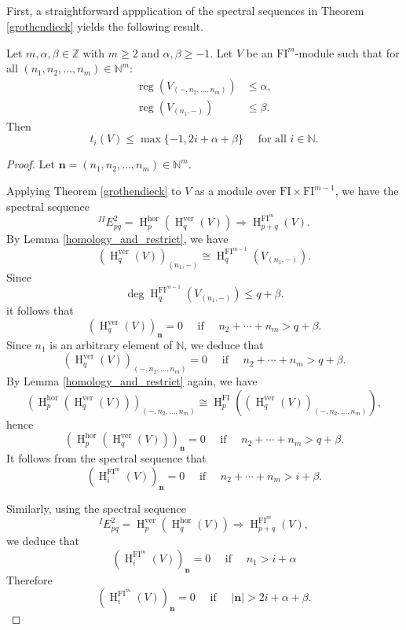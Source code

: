 \documentclass{amsart}
\numberwithin{equation}{section}
\DeclareMathOperator{\reg}{reg}
\DeclareMathOperator{\HH}{H}
\newcommand{\N}{{\mathbb{N}}}
\newcommand{\hor}{{\mathrm{hor}}}
\newcommand{\ver}{{\mathrm{ver}}}
\newcommand{\FI}{{\mathrm{FI}}}
\begin{document}
\subsection{}

First, a straightforward appplication of the spectral sequences in Theorem \ref{grothendieck} yields the following result.

\begin{proposition} \label{prop:1}
   Let $m, \alpha, \beta\in \mathbb{Z}$ with $m\geqslant 2$ and $\alpha, \beta\geqslant -1$. Let $V$ be an $\FI^m$-module such that for all $(n_1, n_2, \ldots, n_m)\in \N^m$:
   \begin{align*}
      \reg\left(V_{(-, n_2, \ldots, n_m)}\right) &\leqslant \alpha,\\
      \reg\left(V_{(n_1, -)}\right) &\leqslant \beta.
   \end{align*} 
   Then 
   \[ t_i(V) \leqslant \max\{-1, 2i + \alpha + \beta\} \quad \mbox{ for all }i\in \N. \]
\end{proposition}

\begin{proof}
   Let $\mathbf{n}=(n_1, n_2, \ldots, n_m) \in \N^m$. 
   
   Applying Theorem \ref{grothendieck} to $V$ as a module over $\FI\times \FI^{m-1}$, we have the spectral sequence
   \[  ^{II}\!E^2_{pq} = \HH^\hor_p (\HH^\ver_q (V)) \Rightarrow \HH^{\FI^m}_{p+q}(V).  \]
   By Lemma \ref{homology_and_restrict}, we have   
   \begin{equation*} 
      (\HH_q^\ver(V))_{(n_1,-)} \cong \HH_q^{\FI^{m-1}}( V_{(n_1,-)} ).  
   \end{equation*} 
   Since 
   \[ \deg \HH_q^{\FI^{m-1}}( V_{(n_1,-)} ) \leqslant q + \beta. \]
   it follows that   
   \[ (\HH^\ver_q (V))_{\mathbf{n}} = 0 \quad \mbox{ if } \quad n_2+\cdots+n_m > q + \beta. \]
   Since $n_1$ is an arbitrary element of $\N$, we deduce that 
   \[ (\HH^\ver_q (V))_{(-, n_2, \ldots, n_m)} = 0 \quad \mbox{ if } \quad n_2+\cdots+n_m > q + \beta. \]
   By Lemma \ref{homology_and_restrict} again, we have
   \[ (\HH^\hor_p (\HH^\ver_q (V)))_{(-, n_2, \ldots, n_m)} \cong \HH_p^{\FI}( (\HH^\ver_q (V))_{(-, n_2, \ldots, n_m)} ), \]
   hence
   \[ (\HH^\hor_p (\HH^\ver_q (V)))_{\mathbf{n}} = 0  \quad\mbox{ if }\quad n_2+\cdots+n_m > q + \beta.  \]
   It follows from the spectral sequence that 
   \[ (\HH^{\FI^m}_i (V))_{\mathbf{n}} = 0  \quad\mbox{ if }\quad n_2+\cdots+n_m > i + \beta. \]

   Similarly, using the spectral sequence 
   \[  ^{I}\!E^2_{pq} = \HH^\ver_p (\HH^\hor_q (V)) \Rightarrow \HH^{\FI^m}_{p+q}(V), \]
   we deduce that
   \[ (\HH^{\FI^m}_i (V))_{\mathbf{n}} = 0  \quad\mbox{ if }\quad n_1 > i + \alpha \]
   Therefore 
   \[ (\HH^{\FI^m}_i (V))_{\mathbf{n}} = 0 \quad\mbox{ if }\quad |\mathbf{n}| > 2i + \alpha + \beta. \]
\end{proof}
\end{document}
